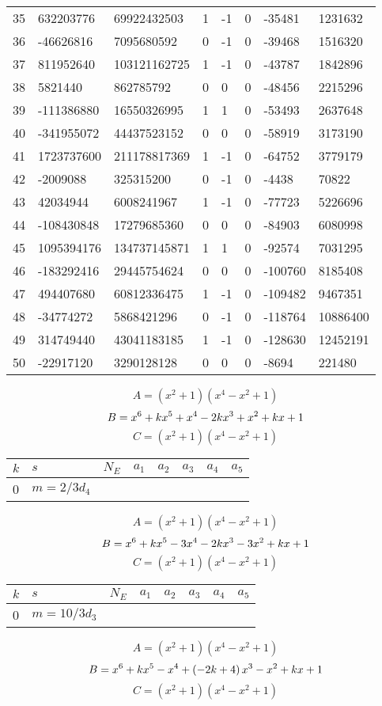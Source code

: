 \documentclass{amsart}
\begin{document}
\begin{longtable}{|l|l|l|lllll|}
35&632203776&69922432503&1&-1&0&-35481&1231632\\
36&-46626816&7095680592&0&-1&0&-39468&1516320\\
37&811952640&103121162725&1&-1&0&-43787&1842896\\
38&5821440&862785792&0&0&0&-48456&2215296\\
39&-111386880&16550326995&1&1&0&-53493&2637648\\
40&-341955072&44437523152&0&0&0&-58919&3173190\\
41&1723737600&211178817369&1&-1&0&-64752&3779179\\
42&-2009088&325315200&0&-1&0&-4438&70822\\
43&42034944&6008241967&1&-1&0&-77723&5226696\\
44&-108430848&17279685360&0&0&0&-84903&6080998\\
45&1095394176&134737145871&1&1&0&-92574&7031295\\
46&-183292416&29445754624&0&0&0&-100760&8185408\\
47&494407680&60812336475&1&-1&0&-109482&9467351\\
48&-34774272&5868421296&0&-1&0&-118764&10886400\\
49&314749440&43041183185&1&-1&0&-128630&12452191\\
50&-22917120&3290128128&0&0&0&-8694&221480\\
\hline
\end{longtable}
$$A=(x^2
 + 1)(x^4
 - x^2
 + 1)$$
$$B=x^6
 + k\*x^5
 + x^4
 - 2\*k\*x^3
 + x^2
 + k\*x
 + 1$$
$$C=(x^2
 + 1)(x^4
 - x^2
 + 1)$$
\begin{longtable}{|l|l|l|lllll|}
\hline
$k$ & $s$ & $N_E$ & $a_1$ & $a_2$ & $a_3$ & $a_4$ & $a_5$\\
\hline
0&$m=2/3d_{4}$&&\multicolumn{5}{c|}{}\\
\hline
\end{longtable}
$$A=(x^2
 + 1)(x^4
 - x^2
 + 1)$$
$$B=x^6
 + k\*x^5
 - 3\*x^4
 - 2\*k\*x^3
 - 3\*x^2
 + k\*x
 + 1$$
$$C=(x^2
 + 1)(x^4
 - x^2
 + 1)$$
\begin{longtable}{|l|l|l|lllll|}
\hline
$k$ & $s$ & $N_E$ & $a_1$ & $a_2$ & $a_3$ & $a_4$ & $a_5$\\
\hline
0&$m=10/3d_{3}$&&\multicolumn{5}{c|}{}\\
\hline
\end{longtable}
$$A=(x^2
 + 1)(x^4
 - x^2
 + 1)$$
$$B=x^6
 + k\*x^5
 - x^4
 + \left(-2\*k
 + 4\right) \*x^3
 - x^2
 + k\*x
 + 1$$
$$C=(x^2
 + 1)(x^4
 - x^2
 + 1)$$
\end{document}
